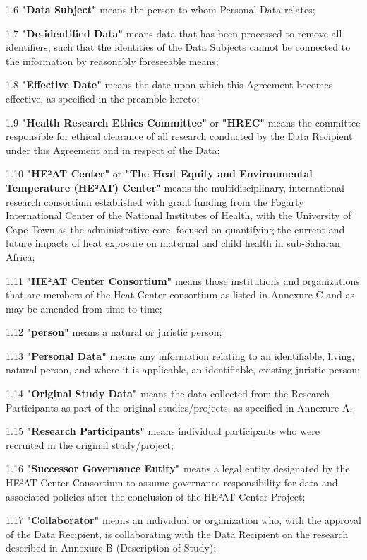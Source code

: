\documentclass[12pt,letterpaper]{article}
\begin{document}
1.6 \textbf{"Data Subject"} means the person to whom Personal Data relates;

1.7 \textbf{"De-identified Data"} means data that has been processed to remove all identifiers, such that the identities of the Data Subjects cannot be connected to the information by reasonably foreseeable means;

1.8 \textbf{"Effective Date"} means the date upon which this Agreement becomes effective, as specified in the preamble hereto;

1.9 \textbf{"Health Research Ethics Committee"} or \textbf{"HREC"} means the committee responsible for ethical clearance of all research conducted by the Data Recipient under this Agreement and in respect of the Data;

1.10 \textbf{"HE²AT Center"} or \textbf{"The Heat Equity and Environmental Temperature (HE²AT) Center"} means the multidisciplinary, international research consortium established with grant funding from the Fogarty International Center of the National Institutes of Health, with the University of Cape Town as the administrative core, focused on quantifying the current and future impacts of heat exposure on maternal and child health in sub-Saharan Africa;

1.11 \textbf{"HE²AT Center Consortium"} means those institutions and organizations that are members of the Heat Center consortium as listed in Annexure C and as may be amended from time to time;

1.12 \textbf{"person"} means a natural or juristic person;

1.13 \textbf{"Personal Data"} means any information relating to an identifiable, living, natural person, and where it is applicable, an identifiable, existing juristic person;

1.14 \textbf{"Original Study Data"} means the data collected from the Research Participants as part of the original studies/projects, as specified in Annexure A;

1.15 \textbf{"Research Participants"} means individual participants who were recruited in the original study/project;

1.16 \textbf{"Successor Governance Entity"} means a legal entity designated by the HE²AT Center Consortium to assume governance responsibility for data and associated policies after the conclusion of the HE²AT Center Project;

1.17 \textbf{"Collaborator"} means an individual or organization who, with the approval of the Data Recipient, is collaborating with the Data Recipient on the research described in Annexure B (Description of Study);
\end{document}
